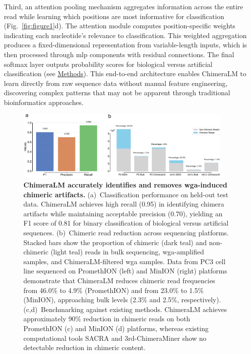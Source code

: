 \documentclass[pdflatex,sn-nature,lineno]{sn-jnl}%
\theoremstyle{thmstyleone}%
\theoremstyle{thmstyletwo}%
\theoremstyle{thmstylethree}%
\begin{document}
Third, an attention pooling mechanism aggregates information across the entire read while learning which positions are most informative for classification (Fig.~\ref{fig:figure1}d).
The attention module computes position-specific weights indicating each nucleotide's relevance to classification.
This weighted aggregation produces a fixed-dimensional representation from variable-length inputs, which is then processed through \gls{mlp} components with residual connections.
The final softmax layer outputs probability scores for biological versus artificial classification (see \hyperref[sec:methods]{Methods}).
This end-to-end architecture enables ChimeraLM to learn directly from raw sequence data without manual feature engineering, discovering complex patterns that may not be apparent through traditional bioinformatics approaches.

\begin{figure}[!ht]
	\begin{center}
		\includegraphics[width=0.95\textwidth]{final_figures/figure2}
	\end{center}
    \caption{{\bf ChimeraLM accurately identifies and removes \gls{wga}-induced chimeric artifacts.}
	(a)~Classification performance on held-out test data.
    ChimeraLM achieves high recall (0.95) in identifying chimera artifacts while maintaining acceptable precision (0.70), yielding an F1 score of 0.81 for binary classification of biological versus artificial sequences.
	(b)~Chimeric read reduction across sequencing platforms.
    Stacked bars show the proportion of chimeric (dark teal) and non-chimeric (light teal) reads in bulk sequencing, \gls{wga}-amplified samples, and ChimeraLM-filtered \gls{wga} samples.
    Data from PC3 cell line sequenced on PromethION (left) and MinION (right) platforms demonstrate that ChimeraLM reduces chimeric read frequencies from 46.0\% to 4.9\% (PromethION) and from 23.0\% to 1.5\% (MinION), approaching bulk levels (2.3\% and 2.5\%, respectively).
	(c,d)~Benchmarking against existing methods.
    ChimeraLM achieves approximately 90\% reduction in chimeric reads on both PromethION (c) and MinION (d) platforms, whereas existing computational tools SACRA and 3rd-ChimeraMiner show no detectable reduction in chimeric content.}\label{fig:figure2}
\end{figure}
\end{document}
